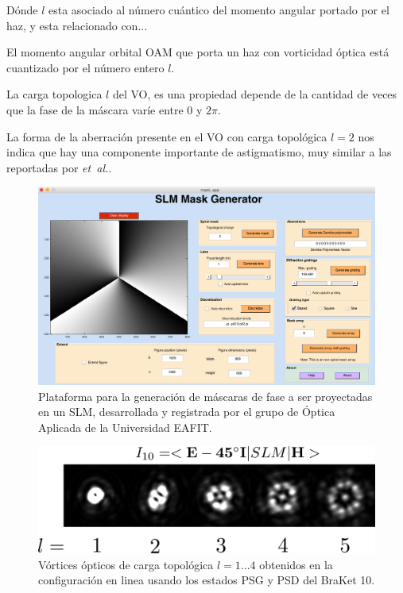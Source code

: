 Dónde $l$ esta asociado al número cuántico del momento angular portado
por el haz, y esta relacionado con...


El momento angular orbital \acrshort{OAM} que porta un haz con
vorticidad óptica está cuantizado por el número entero $l$.  
 
La carga topologica $l$ del VO, es una propiedad  depende de la cantidad de veces que la fase
de la máscara varíe entre $0$ y $2\pi$. 

La forma de la aberración presente en el VO con carga topológica $l=2$
nos indica que hay una componente importante de astigmatismo, muy
similar a las reportadas por  \textit{et~al.}. 

\pagebreak
\begin{figure}[H]
\centering
\includegraphics[scale=0.4]{mask_app.png}
\caption[Plataforma para la generación de máscaras de fase]{Plataforma
  para la generación de máscaras de fase a ser proyectadas en un SLM, desarrollada y registrada por el
  grupo de Óptica Aplicada de la Universidad EAFIT.} 
\label{fig:mask_app}
\end{figure}

\begin{figure}[H]
\centering
\includegraphics[scale=0.4]{OV_I10.pdf}
\caption[Vórtices ópticos obtenidos en la configuración en linea para
el BraKet 10]{Vórtices ópticos de carga topológica $l=1...4$ obtenidos
  en la configuración en linea usando los estados PSG y PSD del BraKet 10.} 
\label{fig:VOs_I10}
\end{figure}

